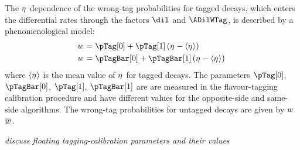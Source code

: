 The $\eta^{}$ dependence of the wrong-tag probabilities for tagged decays, which enters the differential rates through the factors $\dil$
and $\ADilWTag$, is described by a phenomenological model:
\begin{subequations}
  \begin{align}
    \wTag &= \pTag[0]    + \pTag[1]\,    (\etaTag-\langle\etaTag\rangle) \\
    \wTag &= \pTagBar[0] + \pTagBar[1]\, (\etaTag-\langle\etaTag\rangle) \,
  \end{align}
\end{subequations}
where $\langle\eta^{}\rangle$ is the mean value of $\eta^{}$ for tagged decays. The parameters $\pTag[0]$, $\pTagBar[0]$, $\pTag[1]$,
$\pTagBar[1]$ are are measured in the flavour-tagging calibration procedure and have different values for the opposite-side and same-side
algorithms. The wrong-tag probabilities for untagged decays are given by $w^{}$\textequiv$\wTagBar$.

\textit{discuss floating tagging-calibration parameters and their values}

